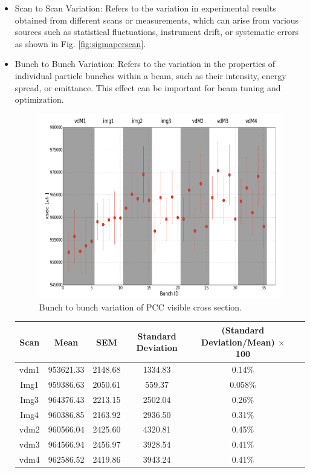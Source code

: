 \begin{itemize}
\item Scan to Scan Variation: Refers to the variation in experimental results obtained from different scans or measurements, which can arise from various sources such as statistical fluctuations, instrument drift, or systematic errors as shown in Fig.  \ref{fig:sigmaperscan}.

\item Bunch to Bunch Variation: Refers to the variation in the properties of individual particle bunches within a beam, such as their intensity, energy spread, or emittance. This effect can be important for beam tuning and optimization.


\begin{figure}[!htp]
\centering
\includegraphics[width=1\textwidth]{ashish_thesis/sigma_vis_btob_var.png}
\caption[]{%
 Bunch to bunch variation of PCC visible cross section.  
}
\label{fig:sigmavis_btob_variation}
\end{figure}


\begin{tabular}{cccccc}
\textbf{Scan} & \textbf{Mean} & \textbf{SEM} & \textbf{Standard Deviation} & \textbf{(Standard Deviation/Mean) $\times$ 100} \\
\hline
vdm1 & 953621.33 & 2148.68 & 1334.83 & 0.14\% \\
Img1 & 959386.63 & 2050.61 & 559.37 & 0.058\% \\
Img3 & 964376.43 & 2213.15 & 2502.04 & 0.26\% \\
Img4 & 960386.85 & 2163.92 & 2936.50 & 0.31\% \\
vdm2 & 960566.04 & 2425.60 & 4320.81 & 0.45\% \\
vdm3 & 964566.94 & 2456.97 & 3928.54 & 0.41\% \\
vdm4 & 962586.52 & 2419.86 & 3943.24 & 0.41\% \\
\end{tabular}



\end{itemize}
